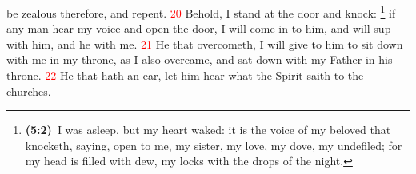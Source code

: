 \documentclass[12pt,twoside]{memoir}
\newcommand{\cbibleref}[3]{\textbf{\ibibleverse[textit]{#1}(#2)}\ {#3}}
\newcommand{\cbiblefoot}[3]{\footnote{\cbibleref{#1}{#2}{#3}}}
\newlength{\drop}
\newcommand{\vnum}[1]{\textcolor{red}{\normalsize{#1}}}
\begin{document}
 be zealous therefore, and repent. %
\vnum{20} Behold, I stand at the door and knock:%
	\cbiblefoot{SongofSongs}{5:2}{I was asleep, but my heart waked: it is the voice of my beloved that knocketh, saying, open to me, my sister, my love, my dove, my undefiled; for my head is filled with dew, my locks with the drops of the night.}
 if any man hear my voice and open the door, I will come in to him, and will sup with him, and he with me. %
\vnum{21} He that overcometh, I will give to him to sit down with me in my throne, as I also overcame, and sat down with my Father in his throne. %
\vnum{22} He that hath an ear, let him hear what the Spirit saith to the churches.

\end{document}
